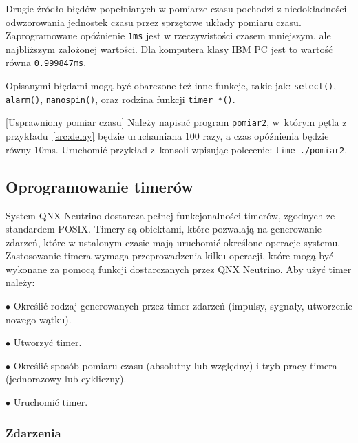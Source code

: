 Drugie źródło błędów popełnianych w pomiarze czasu pochodzi z niedokładności odwzorowania jednostek czasu przez sprzętowe układy pomiaru czasu. Zaprogramowane opóźnienie \lstinline[style=MyCStyle]{1ms} jest w rzeczywistości czasem mniejszym, ale najbliższym założonej wartości. Dla komputera klasy IBM PC jest to wartość równa \lstinline[style=MyCStyle]{0.999847ms}.

Opisanymi błędami mogą być obarczone też inne funkcje, takie jak: \lstinline[style=MyCStyle]{select()}, \lstinline[style=MyCStyle]{alarm()}, \lstinline[style=MyCStyle]{nanospin()}, oraz rodzina funkcji \lstinline[style=MyCStyle]{timer_*()}.

\begin{example}{[Usprawniony pomiar czasu]} Należy napisać program \lstinline[style=MyCStyle]{pomiar2}, w~którym pętla z przykładu~\ref{src:delay} będzie uruchamiana 100 razy, a czas opóźnienia będzie równy 10ms. Uruchomić przykład z~konsoli wpisując polecenie: \lstinline[style=MyCStyle]{time ./pomiar2}.
\end{example}

\subsection{Oprogramowanie timerów}

System QNX Neutrino dostarcza pełnej funkcjonalności timerów, zgodnych ze standardem POSIX. Timery są obiektami, które pozwalają na generowanie zdarzeń, które w ustalonym czasie mają uruchomić określone operacje systemu. Zastosowanie timera wymaga przeprowadzenia kilku operacji, które mogą być wykonane za pomocą funkcji dostarczanych przez QNX Neutrino. Aby użyć timer należy:

\begin{myitemize}
\item[$\bullet$] Określić rodzaj generowanych przez timer zdarzeń (impulsy, sygnały, utworzenie nowego wątku).
\item[$\bullet$] Utworzyć timer.
\item[$\bullet$] Określić sposób pomiaru czasu (absolutny lub względny) i tryb pracy timera (jednorazowy lub cykliczny).
\item[$\bullet$] Uruchomić timer.
\end{myitemize}

\subsubsection{Zdarzenia}

